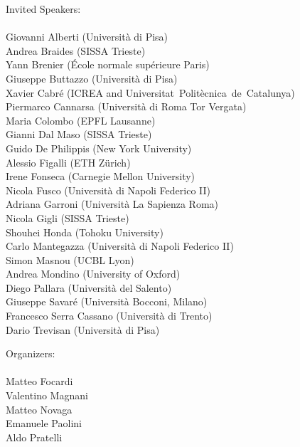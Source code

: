 \documentclass[a4paper]{article}
\newcommand{\buh}[1]{\textsf{#1}\\}
\begin{document}
\color{my}
\vspace{3cm}
\mbox{}\hspace{1cm}
\begin{minipage}{0.45\textwidth}
\Large
\buh{Invited Speakers:}
\\
\normalsize
\textsf{
Giovanni Alberti (Università di Pisa)\\
Andrea Braides (SISSA Trieste)\\
Yann Brenier (École normale supérieure Paris)\\
Giuseppe Buttazzo (Università di Pisa)\\
Xavier Cabré (ICREA and \mbox{Universitat~Politècnica~de~Catalunya)\hspace{-3cm}\mbox{}}\\
Piermarco Cannarsa (Università di Roma Tor Vergata)\\
Maria Colombo (EPFL Lausanne)\\
Gianni Dal Maso (SISSA Trieste)\\
Guido De Philippis (New York University)\\
Alessio Figalli (ETH Zürich)\\
Irene Fonseca (Carnegie Mellon University)\\
Nicola Fusco (Università di Napoli Federico II)\\
Adriana Garroni (Università La Sapienza Roma)\\
Nicola Gigli (SISSA Trieste)\\
Shouhei Honda (Tohoku University)\\
Carlo Mantegazza (Università di Napoli Federico II)\\
Simon Masnou (UCBL Lyon)\\
Andrea Mondino (University of Oxford)\\
Diego Pallara (Università del Salento)\\
Giuseppe Savaré (Università Bocconi, Milano)\\
Francesco Serra Cassano (Università di Trento)\\
Dario Trevisan (Università di Pisa)\\
}
\end{minipage}
\vspace{1.4cm}
\hspace{4cm}
\begin{minipage}{0.45\textwidth}
    \vspace{7cm}
    \Large
    \buh{Organizers:}
    \\
    \normalsize
    \textsf{
        Matteo Focardi\\
        Valentino Magnani\\
        Matteo Novaga\\
        Emanuele Paolini\\
        Aldo Pratelli
    }\\
    \end{minipage}
\end{document}
